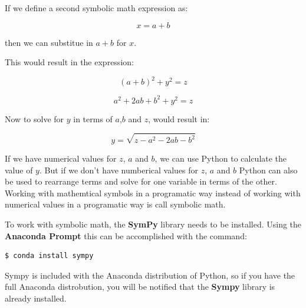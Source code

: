 \documentclass{book}
\begin{document}
    
        If we define a second symbolic math expression as:
    




    
        \[ x = a + b \]
    




    
        then we can substitue in \(a + b\) for \(x\).
    




    
        This would result in the expression:
    




    
        \[ (a + b)^{2} + y^{2} = z \]

\[ a^{2} + 2ab + b^{2} + y^{2} = z \]
    




    
        Now to solve for \(y\) in terms of \(a\),\(b\) and \(z\), would result
in:

\[ y = \sqrt{z - a^{2} - 2ab - b^{2}} \]
    




    
        If we have numerical values for \(z\), \(a\) and \(b\), we can use
Python to calculate the value of \(y\). But if we don't have numberical
values for \(z\), \(a\) and \(b\) Python can also be used to rearrange
terms and solve for one variable in terms of the other. Working with
mathemtical symbols in a programatic way instead of working with
numerical values in a programatic way is call symbolic math.
    




    
        To work with symbolic math, the \textbf{SymPy} library needs to be
installed. Using the \textbf{Anaconda Prompt} this can be accomplished
with the command:

\begin{lstlisting}[language=bash]
$ conda install sympy
\end{lstlisting}
    




    
        Sympy is included with the Anaconda distribution of Python, so if you
have the full Anaconda distrobution, you will be notified that the
\textbf{Sympy} library is already installed.
    
\end{document}
